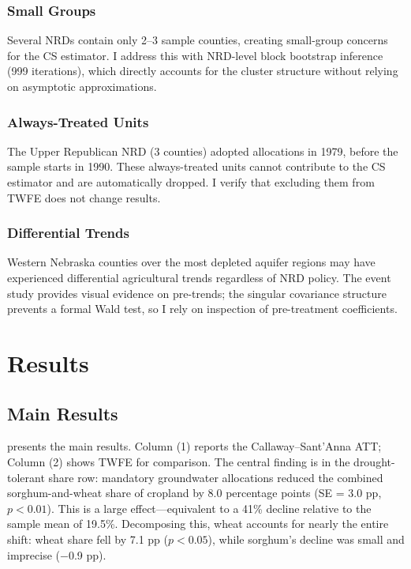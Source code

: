 \documentclass[12pt]{article}
\begin{document}
\subsubsection*{Small Groups} Several NRDs contain only 2--3 sample counties, creating small-group concerns for the CS estimator. I address this with NRD-level block bootstrap inference (999 iterations), which directly accounts for the cluster structure without relying on asymptotic approximations.

\subsubsection*{Always-Treated Units} The Upper Republican NRD (3 counties) adopted allocations in 1979, before the sample starts in 1990. These always-treated units cannot contribute to the CS estimator and are automatically dropped. I verify that excluding them from TWFE does not change results.

\subsubsection*{Differential Trends} Western Nebraska counties over the most depleted aquifer regions may have experienced differential agricultural trends regardless of NRD policy. The event study provides visual evidence on pre-trends; the singular covariance structure prevents a formal Wald test, so I rely on inspection of pre-treatment coefficients.


\section{Results}

\subsection{Main Results}



 presents the main results. Column (1) reports the Callaway--Sant'Anna ATT; Column (2) shows TWFE for comparison. The central finding is in the drought-tolerant share row: mandatory groundwater allocations reduced the combined sorghum-and-wheat share of cropland by 8.0 percentage points (SE = 3.0 pp, $p < 0.01$). This is a large effect---equivalent to a 41\% decline relative to the sample mean of 19.5\%. Decomposing this, wheat accounts for nearly the entire shift: wheat share fell by 7.1 pp ($p < 0.05$), while sorghum's decline was small and imprecise ($-$0.9 pp).
\end{document}

